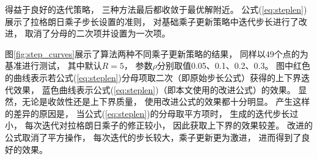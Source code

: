 得益于良好的迭代策略，
三种方法最后都收敛于最优解附近。
公式(\ref{eq:steplen})展示了拉格朗日乘子步长设置的准则，
对基础乘子更新策略中迭代步长进行了改进，
取消了分母的二次项并设置为一次项。

图\ref{fig:step_curves}展示了算法两种不同乘子更新策略的结果，
同样以49个点的为基准进行测试，
其中默认$R=5$，
参数$\rho$分别取值0.05、0.1、0.2、0.3。
图中红色的曲线表示若公式(\ref{eq:steplen})分母项取二次（即原始步长公式）获得的上下界迭代效果，
蓝色曲线表示公式(\ref{eq:steplen})（即本文使用的改进公式）的效果。
显然，无论是收敛性还是上下界质量，
使用改进公式的效果都十分明显。
产生这样的差异的原因是，
当公式(\ref{eq:steplen})的分母取平方项时，
生成的迭代步长过小，
每次迭代对拉格朗日乘子的修正较小，
因此获取上下界的效果较差。
改进的公式取消了平方操作，
每次迭代的步长较大，乘子更新更为激进，
进而得到了良好的效果。



